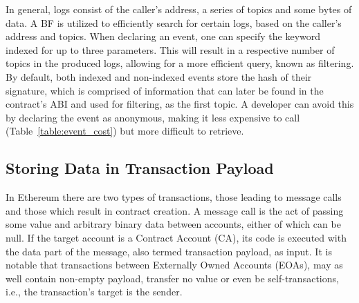 \begin{table}[htbp]
\caption{Generalized cost model for different types of events. Gas costs were populated according to the logging operations $G_{\mathrm{logdata}}$ and  $G_{\mathrm{logtopic}}$ which are presented in table \ref{table:operations_cost}.}
\label{table:event_cost}
\end{table}

In general, logs consist of the caller’s address, a series of topics and some bytes of data. A BF is utilized to efficiently search for certain logs, based on the caller’s address and topics. When declaring an event, one can specify the keyword indexed for up to three parameters. This will result in a respective number of topics in the produced logs, allowing for a more efficient query, known as filtering. By default, both indexed and non-indexed events store the hash of their signature, which is comprised of information that can later be found in the contract’s ABI and used for filtering, as the first topic. A developer can avoid this by declaring the event as anonymous, making it less expensive to call (Table~\ref{table:event_cost}) but more difficult to retrieve.

\subsection{Storing Data in Transaction Payload}\label{subsection:}
In Ethereum there are two types of transactions, those leading to message calls and those which result in contract creation. A message call is the act of passing some value and arbitrary binary data between accounts, either of which can be null. If the target account is a Contract Account (CA), its code is executed with the data part of the message, also termed transaction payload, as input. It is notable that transactions between Externally Owned Accounts (EOAs), may as well contain non-empty payload, transfer no value or even be self-transactions, i.e., the transaction's target is the sender.

